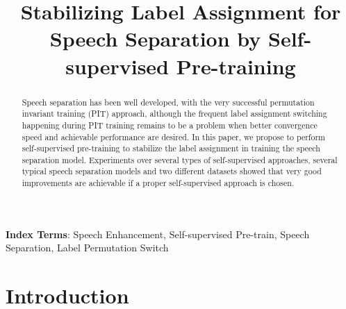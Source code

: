 \documentclass[a4paper]{article}
\title{Stabilizing Label Assignment for Speech Separation by Self-supervised Pre-training}
\begin{document}
\maketitle
\begin{abstract}
Speech separation has been well developed, with the very successful permutation invariant training (PIT) approach, although the frequent label assignment switching happening during PIT training remains to be a problem when better convergence speed and achievable performance are desired.
In this paper, we propose to perform self-supervised pre-training to stabilize the label assignment in training the speech separation model.
Experiments over several types of self-supervised approaches, several typical speech separation models and two different datasets showed that very good improvements are achievable if a proper self-supervised approach is chosen.


\end{abstract}
\noindent\textbf{Index Terms}: Speech Enhancement, Self-supervised Pre-train, Speech Separation, Label Permutation Switch

\section{Introduction}
\label{sec:intro}
\end{document}
